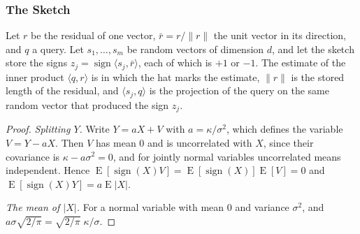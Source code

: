 \subsubsection{The Sketch}

Let $r$ be the residual of one vector,
$\bar r = r / \lVert r \rVert$ the unit vector in its direction, and $q$ a
query. Let $s_1, \dots, s_m$ be random vectors of dimension $d$, and let the
sketch store the signs
$z_j = \operatorname{sign} \langle s_j, \bar r \rangle$, each of which is
$+1$ or $-1$. The estimate of the inner product $\langle q, r \rangle$ is
in which the hat marks the estimate, $\lVert r \rVert$ is the stored length
of the residual, and $\langle s_j, q \rangle$ is the projection of the query
on the same random vector that produced the sign $z_j$.


\begin{proof}
\emph{Splitting $Y$.} Write $Y = a X + V$ with $a = \kappa / \sigma^2$, which
defines the variable $V = Y - a X$. Then $V$ has mean $0$ and is uncorrelated
with $X$, since their covariance is $\kappa - a \sigma^2 = 0$, and for
jointly normal variables uncorrelated means independent. Hence
$\operatorname{E}[\operatorname{sign}(X) V] = \operatorname{E}[\operatorname{sign}(X)] \operatorname{E}[V] = 0$
and
$\operatorname{E}[\operatorname{sign}(X) Y] = a \operatorname{E}\lvert X \rvert$.

\emph{The mean of $\lvert X \rvert$.} For a normal variable with mean $0$ and
variance $\sigma^2$,
and $a \sigma \sqrt{2/\pi} = \sqrt{2/\pi}\; \kappa / \sigma$.
\end{proof}

